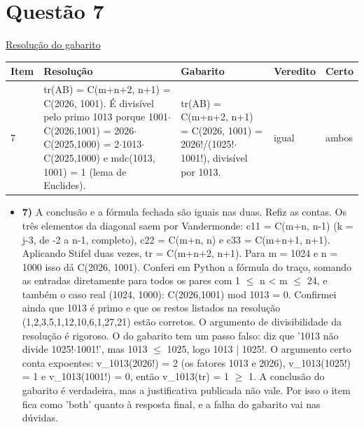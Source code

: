 \documentclass{article}%
\begin{document}
\section*{Questão 7}%
\href{https://poliedroresolve.sistemapoliedro.com.br/vestibulares/ime/2027/ime-2-fase-dia-1-26-10-2026-2-fase-dia-1/dissertativa-7-matematica-2-fase-dia-1-ime-2027}{Resolução do gabarito}\par\smallskip%
\begin{longtable}{@{}p{} p{} p{} p{} p{}@{}}\toprule Item & Resolução & Gabarito & Veredito & Certo \\ \midrule
7 & tr(AB) = C(m+n+2, n+1) = C(2026, 1001). É divisível pelo primo 1013 porque 1001$\cdot$C(2026,1001) = 2026$\cdot$C(2025,1000) = 2$\cdot$1013$\cdot$C(2025,1000) e mdc(1013, 1001) = 1 (lema de Euclides). & tr(AB) = C(m+n+2, n+1) = C(2026, 1001) = 2026!/(1025!$\cdot$1001!), divisível por 1013. & igual & ambos \\
\bottomrule\end{longtable}%
\begin{itemize}%
\item%
\textbf{7)} A conclusão e a fórmula fechada são iguais nas duas. Refiz as contas. Os três elementos da diagonal saem por Vandermonde: c11 = C(m+n, n-1) (k = j-3, de -2 a n-1, completo), c22 = C(m+n, n) e c33 = C(m+n+1, n+1). Aplicando Stifel duas vezes, tr = C(m+n+2, n+1). Para m = 1024 e n = 1000 isso dá C(2026, 1001). Conferi em Python a fórmula do traço, somando as entradas diretamente para todos os pares com 1 $\leq$ n < m $\leq$ 24, e também o caso real (1024, 1000): C(2026,1001) mod 1013 = 0. Confirmei ainda que 1013 é primo e que os restos listados na resolução (1,2,3,5,1,12,10,6,1,27,21) estão corretos. O argumento de divisibilidade da resolução é rigoroso. O do gabarito tem um passo falso: diz que '1013 não divide 1025!$\cdot$1001!', mas 1013 $\leq$ 1025, logo 1013 | 1025!. O argumento certo conta expoentes: v\_1013(2026!) = 2 (os fatores 1013 e 2026), v\_1013(1025!) = 1 e v\_1013(1001!) = 0, então v\_1013(tr) = 1 $\geq$ 1. A conclusão do gabarito é verdadeira, mas a justificativa publicada não vale. Por isso o item fica como 'both' quanto à resposta final, e a falha do gabarito vai nas dúvidas.%
\end{itemize}%
\end{document}
